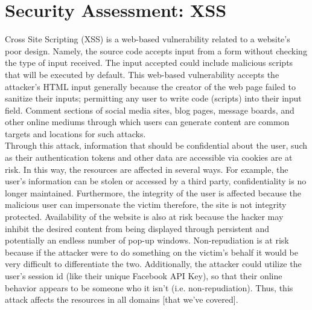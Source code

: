 \documentclass[11pt]{article}
\begin{document}
\section{Security Assessment: XSS}

Cross Site Scripting (XSS) is a web-based vulnerability related to a website's poor design. Namely, the source code accepts input from a form without checking the type of input received. The input accepted could include malicious scripts that will be executed by default. This web-based vulnerability accepts the attacker’s HTML input generally because the creator of the web page failed to sanitize their inputs; permitting any user to write code (scripts) into their input field. Comment sections of social media sites, blog pages, message boards, and other online mediums through which users can generate content are common targets and locations for such attacks.\\

Through this attack, information that should be confidential about the user, such as their authentication tokens and other data are accessible via cookies are at risk. In this way, the resources are affected in several ways. For example, the user’s information can be stolen or accessed by a third party, confidentiality is no longer maintained. Furthermore, the integrity of the user is affected because the malicious user can impersonate the victim therefore, the site is not integrity protected. Availability of the website is also at risk because the hacker may inhibit the desired content from being displayed through persistent and potentially an endless number of pop-up windows. Non-repudiation is at risk because if the attacker were to do something on the victim's behalf it would be very difficult to differentiate the two.  Additionally, the attacker could utilize the user’s session id (like their unique Facebook API Key), so that their online behavior appears to be someone who it isn’t (i.e. non-repudiation). Thus, this attack affects the resources in all domains [that we’ve covered]. \\
\end{document}
